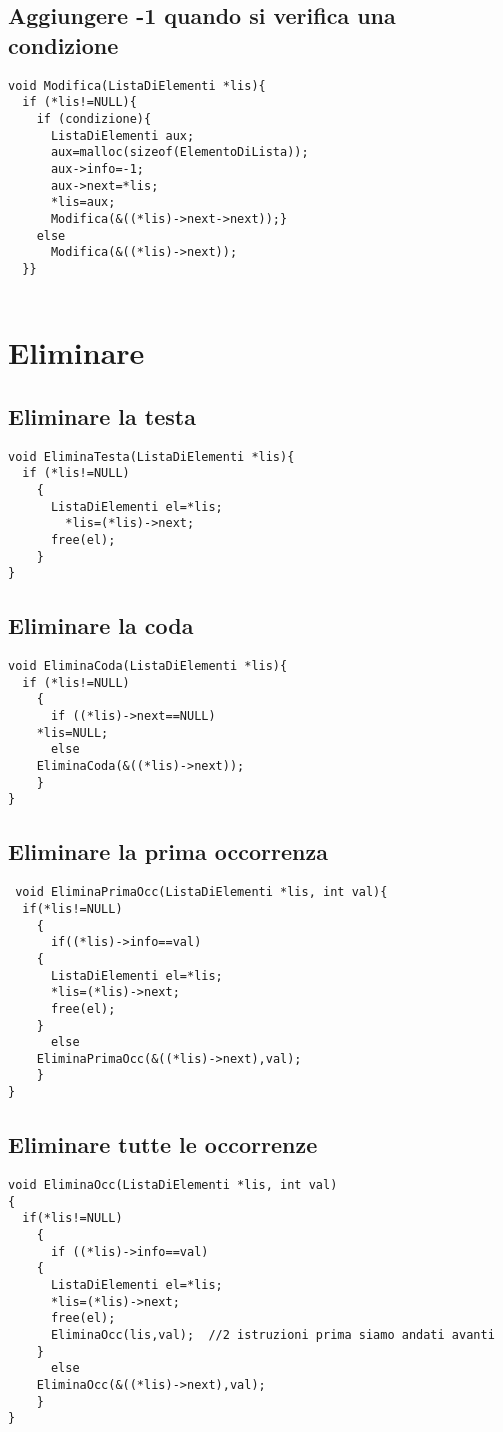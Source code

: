 \documentclass[a4paper,12pt,openany]{book}
\begin{document}
 \section{Aggiungere -1 quando si verifica una condizione}
 \begin{lstlisting}
void Modifica(ListaDiElementi *lis){
  if (*lis!=NULL){
    if (condizione){
      ListaDiElementi aux;
      aux=malloc(sizeof(ElementoDiLista));
      aux->info=-1;
      aux->next=*lis;
      *lis=aux;
      Modifica(&((*lis)->next->next));}
    else
      Modifica(&((*lis)->next));
  }}


\end{lstlisting}
\chapter{Eliminare}

\section{Eliminare la testa}
 \begin{lstlisting}
void EliminaTesta(ListaDiElementi *lis){
  if (*lis!=NULL)
    {
      ListaDiElementi el=*lis;
        *lis=(*lis)->next;
      free(el);
    }
}
\end{lstlisting}

\section{Eliminare la  coda}
 \begin{lstlisting}
void EliminaCoda(ListaDiElementi *lis){
  if (*lis!=NULL)
    {
      if ((*lis)->next==NULL)
	*lis=NULL;
      else
	EliminaCoda(&((*lis)->next));
    }
}

\end{lstlisting}
\newpage

\section{Eliminare  la prima occorrenza }
 \begin{lstlisting}
 void EliminaPrimaOcc(ListaDiElementi *lis, int val){
  if(*lis!=NULL)
    {
      if((*lis)->info==val)
	{
	  ListaDiElementi el=*lis;
	  *lis=(*lis)->next;
	  free(el);
	}
      else
	EliminaPrimaOcc(&((*lis)->next),val);
    }
}
\end{lstlisting}

\section{Eliminare tutte le occorrenze}
 \begin{lstlisting}
void EliminaOcc(ListaDiElementi *lis, int val)
{
  if(*lis!=NULL)
    {
      if ((*lis)->info==val)
	{
	  ListaDiElementi el=*lis;
	  *lis=(*lis)->next;
	  free(el);
	  EliminaOcc(lis,val);  //2 istruzioni prima siamo andati avanti
	}
      else
	EliminaOcc(&((*lis)->next),val);
    }
}

\end{lstlisting}
\newpage
\end{document}
